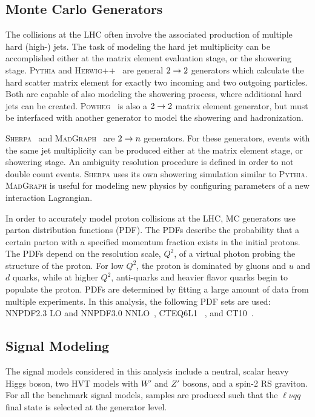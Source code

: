 %
\subsection{Monte Carlo Generators}
The collisions at the LHC often involve the associated production of multiple hard (high-\pT) jets. The task of modeling the hard jet multiplicity can be accomplished either at the matrix element evaluation stage, or the showering stage. \textsc{Pythia} and \textsc{Herwig++}~\cite{herwig} are general $2\rightarrow2$ generators which calculate the hard scatter matrix element for exactly two incoming and two outgoing particles. Both are capable of also modeling the showering process, where additional hard jets can be created. \textsc{Powheg}~\cite{powheg, powhegbox} is also a $2\rightarrow2$ matrix element generator, but must be interfaced with another generator to model the showering and hadronization. 

\textsc{Sherpa}~\cite{sherpa} and \textsc{MadGraph}~\cite{mg5_anlo} are $2\rightarrow n$ generators. For these generators, events with the same jet multiplicity can be produced either at the matrix element stage, or showering stage. An ambiguity resolution procedure is defined in order to not double count events.  \textsc{Sherpa} uses its own showering simulation similar to \textsc{Pythia}.  \textsc{MadGraph} is useful for modeling new physics by configuring parameters of a new interaction Lagrangian.

In order to accurately model proton collisions at the LHC, MC generators use parton distribution functions (PDF). The PDFs describe the probability that a certain parton with a specified momentum fraction exists in the initial protons. The PDFs depend on the resolution scale, $Q^2$, of a virtual photon probing the structure of the proton. For low $Q^2$, the proton is dominated by gluons and $u$ and $d$ quarks, while at higher $Q^2$, anti-quarks and heavier flavor quarks begin to populate the proton. PDFs are determined by fitting a large amount of data from multiple experiments. In this analysis, the following PDF sets are used: \textsc{NNPDF2.3} LO and \textsc{NNPDF3.0} NNLO~\cite{nnpdf}, \textsc{CTEQ6L1} ~\cite{cteq6l}, and \textsc{CT10}~\cite{ct10}.

%
\subsection{Signal Modeling}
\label{ch:anstrat:sm}
The signal models considered in this analysis include a neutral, scalar heavy Higgs boson, two HVT models with $W'$ and $Z'$ bosons, and a spin-2 RS graviton. For all the benchmark signal models, samples are produced such that the $\ell\nu qq$ final state is selected at the generator level.

